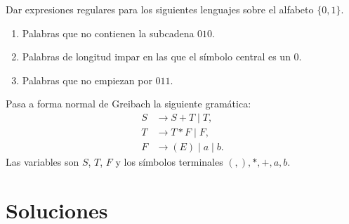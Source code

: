 \documentclass[12pt]{article}
\begin{document}
    \begin{ejercicio}[2.5 puntos]
        Dar expresiones regulares para los siguientes lenguajes sobre el alfabeto $\{0, 1\}$.
        \begin{enumerate}
            \item Palabras que no contienen la subcadena $010$.
            \item Palabras de longitud impar en las que el símbolo central es un $0$.
            \item Palabras que no empiezan por $011$.
        \end{enumerate}
    \end{ejercicio}

    \begin{ejercicio}[2.5 puntos]
        Pasa a forma normal de Greibach la siguiente gramática:
        \begin{align*}
            S &\to S + T \mid T, \\
            T &\to T * F \mid F, \\
            F &\to (E) \mid a \mid b.
        \end{align*}
        Las variables son $S$, $T$, $F$ y los símbolos terminales $(, ), *, +, a, b$.
    \end{ejercicio}



    \newpage
    \setcounter{ejercicio}{0}
    \section*{Soluciones}
\end{document}
